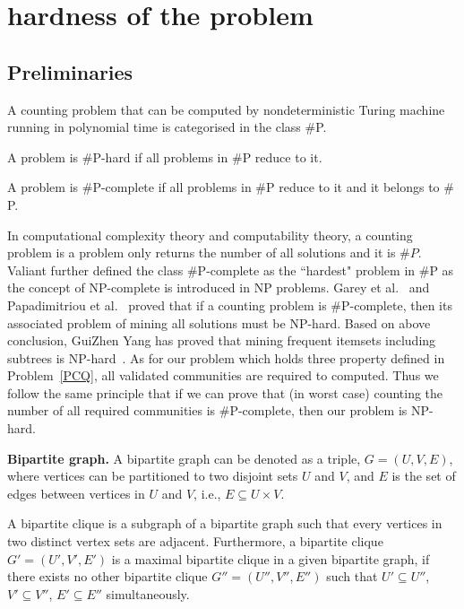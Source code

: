 \clearpage
\section{hardness of the problem}
\label{PCQharness}

\subsection{Preliminaries}
\begin{definition}
A counting problem that can be computed by nondeterministic Turing machine running in polynomial time is categorised in the class $\#$P.
\end{definition}

\begin{definition}
A problem is $\#$P-hard if all problems in $\#$P reduce to it. 
\end{definition}

\begin{definition}
A problem is $\#$P-complete if all problems in $\#$P reduce to it and it belongs to $\#$P. 
\end{definition}

In computational complexity theory and computability theory, a counting problem is a problem only returns the number of all solutions and it is $\#P$. Valiant further defined the class $\#$P-complete as the ``hardest" problem in $\#$P as the concept of NP-complete is introduced in NP problems. Garey et al.~\cite{garey1979guide} and Papadimitriou et al.~\cite{papadimitriou2003computational} proved that if a counting problem is $\#$P-complete, then its associated problem of mining all solutions must be NP-hard. Based on above conclusion, GuiZhen Yang has proved that mining frequent itemsets including subtrees is NP-hard~\cite{yang2004complexity}. As for our problem which holds three property defined in Problem~\ref{PCQ}, all validated communities are required to computed. Thus we follow the same principle that if we can prove that (in worst case) counting the number of all required communities is $\#$P-complete, then our problem is NP-hard. 

{\bf Bipartite graph.}
A bipartite graph can be denoted as a triple, $G=(U,V,E)$, where vertices can be partitioned to two disjoint sets $U$ and $V$, and $E$ is the set of edges between vertices in $U$ and $V$, i.e., $E\subseteq U\times V$.  

A bipartite clique is a subgraph of a bipartite graph such that every vertices in two distinct vertex sets are adjacent. Furthermore, a bipartite clique $G'=(U',V',E')$ is a maximal bipartite clique in a given bipartite graph, if there exists no other bipartite clique $G''=(U'',V'',E'')$ such that $U'\subseteq U''$, $V'\subseteq V''$, $E'\subseteq E''$ simultaneously. 

